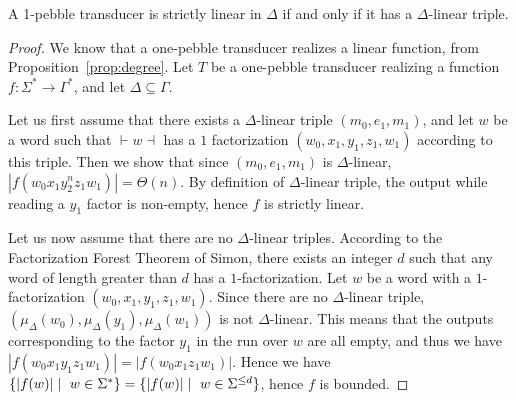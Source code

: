 \begin{theorem}\label{thm:linear}
A 1-pebble transducer is strictly linear in $\Delta$ if and only if it has a $\Delta$-linear triple.
\end{theorem}

\begin{proof}
    We know that a one-pebble transducer realizes a linear function, from Proposition~\ref{prop:degree}.
    Let $T$ be a one-pebble transducer realizing a function $f:\Sigma^*\rightarrow \Gamma^*$, and let $\Delta\subseteq \Gamma$.

    Let us first assume that there exists a $\Delta$-linear triple $(m_0,e_1,m_1)$, and let $w$ be a word such that $\vdash w\dashv $ has a $1$ factorization $(w_0,x_1,y_1,z_1,w_1)$ according to this triple.
    Then we show that since $(m_0,e_1,m_1)$ is $\Delta$-linear, $|f(w_0x_1y_2^nz_1w_1)|=\Theta(n)$.
    By definition of $\Delta$-linear triple, the output while reading a $y_1$ factor is non-empty, hence $f$ is strictly linear.

    Let us now assume that there are no $\Delta$-linear triples.
    According to the Factorization Forest Theorem of Simon, there exists an integer $d$ such that any word of length greater than $d$ has a $1$-factorization.
    Let $w$ be a word with a $1$-factorization $(w_0,x_1,y_1,z_1,w_1)$. Since there are no $\Delta$-linear triple, $(\mu_\Delta(w_0),\mu_\Delta(y_1),\mu_\Delta(w_1))$ is not $\Delta$-linear. This means that the outputs corresponding to the factor $y_1$ in the run over $w$ are all empty, and thus we have $|f(w_0x_1y_1z_1w_1)|=|f(w_0x_1z_1w_1)|$.
    Hence we have $\{|f(w)|\mid\ w\in \Sigma^*\}=\{|f(w)|\mid\ w\in \Sigma^{\leq d}\}$, hence $f$ is bounded.
\end{proof}